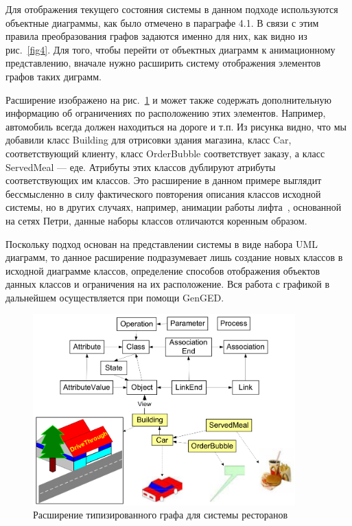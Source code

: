 \documentclass[a5paper]{article}
\begin{document}
Для отображения текущего состояния системы в данном подходе используются объектные диаграммы, как было отмечено в параграфе 4.1. В связи с этим правила преобразования графов задаются именно для них, как видно из рис.~\ref{fig4}. Для того, чтобы перейти от объектных диаграмм к анимационному представлению, вначале нужно расширить систему отображения элементов графов таких диграмм.

Расширение изображено на рис.~\ref{fig5} и может также содержать дополнительную информацию об ограничениях по расположению этих элементов. Например, автомобиль всегда должен находиться на дороге и т.п. Из рисунка видно, что мы добавили класс Building для отрисовки здания магазина, класс Car, соответствующий клиенту, класс OrderBubble соответствует заказу, а класс ServedMeal --- еде. Атрибуты этих классов дублируют атрибуты соответствующих им классов. Это расширение в данном примере выглядит бессмысленно в силу фактического повторения описания классов исходной системы, но в других случаях, например, анимации работы лифта~\cite{genged1}, основанной на сетях Петри, данные наборы классов отличаются коренным образом.

Поскольку подход основан на представлении системы в виде набора UML диаграмм, то данное расширение подразумевает лишь создание новых классов в исходной диаграмме классов, определение способов отображения объектов данных классов и ограничения на их расположение. Вся работа с графикой в дальнейшем осуществляется при помощи GenGED.

\begin{figure} [ht]
  \begin{center}
    \includegraphics[width=0.9\textwidth]{5.png}
    \caption{Расширение типизированного графа для системы ресторанов}
    \label{fig5}
  \end{center}
\end{figure}
\end{document}
